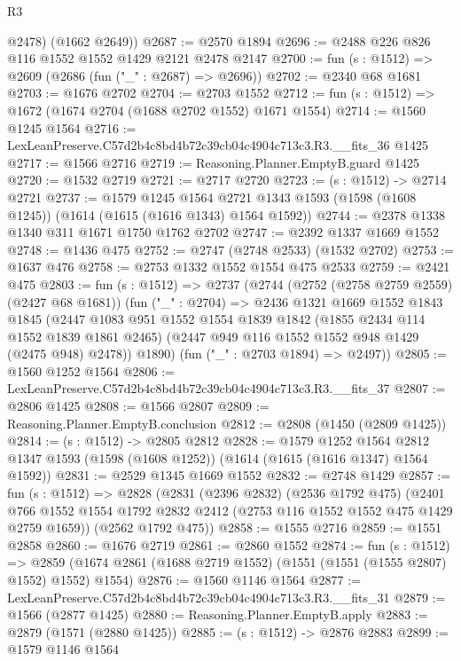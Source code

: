 \begin{lexlean}{R3}
\begin{coremodule}
        @2478)
      (@1662 @2649))
@2687 := @2570 @1894
@2696 := @2488 @226 @826 @116 @1552 @1552 @1429 @2121 @2478 @2147
@2700 := fun (s : @1512) => @2609 (@2686 (fun ("_" : @2687) => @2696))
@2702 := @2340 @68 @1681
@2703 := @1676 @2702
@2704 := @2703 @1552
@2712 := fun (s : @1512) => @1672 (@1674 @2704 (@1688 @2702 @1552) @1671 @1554)
@2714 := @1560 @1245 @1564
@2716 := LexLeanPreserve.C57d2b4c8bd4b72c39cb04c4904c713c3.R3.__fits_36 @1425
@2717 := @1566 @2716
@2719 := Reasoning.Planner.EmptyB.guard @1425
@2720 := @1532 @2719
@2721 := @2717 @2720
@2723 := (s : @1512) -> @2714 @2721
@2737 := @1579
    @1245
    @1564
    @2721
    @1343
    @1593
    (@1598 (@1608 @1245))
    (@1614 (@1615 (@1616 @1343) @1564 @1592))
@2744 := @2378 @1338 @1340 @311 @1671 @1750 @1762 @2702
@2747 := @2392 @1337 @1669 @1552
@2748 := @1436 @475
@2752 := @2747 (@2748 @2533) (@1532 @2702)
@2753 := @1637 @476
@2758 := @2753 @1332 @1552 @1554 @475 @2533
@2759 := @2421 @475
@2803 := fun (s : @1512) =>
  @2737
    (@2744
      (@2752 (@2758 @2759 @2559) (@2427 @68 @1681))
      (fun ("_" : @2704) =>
      @2436
        @1321
        @1669
        @1552
        @1843
        @1845
        (@2447
          @1083
          @951
          @1552
          @1554
          @1839
          @1842
          (@1855 @2434 @114 @1552 @1839 @1861 @2465)
          (@2447 @949 @116 @1552 @1552 @948 @1429 (@2475 @948) @2478))
        @1890)
      (fun ("_" : @2703 @1894) => @2497))
@2805 := @1560 @1252 @1564
@2806 := LexLeanPreserve.C57d2b4c8bd4b72c39cb04c4904c713c3.R3.__fits_37
@2807 := @2806 @1425
@2808 := @1566 @2807
@2809 := Reasoning.Planner.EmptyB.conclusion
@2812 := @2808 (@1450 (@2809 @1425))
@2814 := (s : @1512) -> @2805 @2812
@2828 := @1579
    @1252
    @1564
    @2812
    @1347
    @1593
    (@1598 (@1608 @1252))
    (@1614 (@1615 (@1616 @1347) @1564 @1592))
@2831 := @2529 @1345 @1669 @1552
@2832 := @2748 @1429
@2857 := fun (s : @1512) =>
  @2828
    (@2831
      (@2396 @2832)
      (@2536 @1792 @475)
      (@2401 @766 @1552 @1554 @1792 @2832 @2412 (@2753 @116 @1552 @1552 @475 @1429 @2759 @1659))
      (@2562 @1792 @475))
@2858 := @1555 @2716
@2859 := @1551 @2858
@2860 := @1676 @2719
@2861 := @2860 @1552
@2874 := fun (s : @1512) =>
  @2859 (@1674 @2861 (@1688 @2719 @1552) (@1551 (@1551 (@1555 @2807) @1552) @1552) @1554)
@2876 := @1560 @1146 @1564
@2877 := LexLeanPreserve.C57d2b4c8bd4b72c39cb04c4904c713c3.R3.__fits_31
@2879 := @1566 (@2877 @1425)
@2880 := Reasoning.Planner.EmptyB.apply
@2883 := @2879 (@1571 (@2880 @1425))
@2885 := (s : @1512) -> @2876 @2883
@2899 := @1579
    @1146
    @1564

\end{coremodule}
\end{lexlean}
